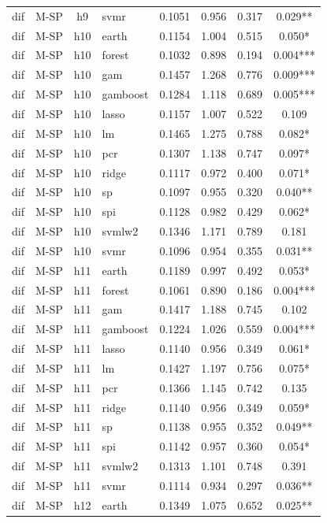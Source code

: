 \begin{ThreePartTable}
\begin{longtable}[t]{llclcccc}
dif & M-SP & h9 & svmr & 0.1051 & 0.956 & 0.317 & 0.029**\\
\addlinespace
dif & M-SP & h10 & earth & 0.1154 & 1.004 & 0.515 & 0.050*\\
dif & M-SP & h10 & forest & 0.1032 & 0.898 & 0.194 & 0.004***\\
dif & M-SP & h10 & gam & 0.1457 & 1.268 & 0.776 & 0.009***\\
dif & M-SP & h10 & gamboost & 0.1284 & 1.118 & 0.689 & 0.005***\\
dif & M-SP & h10 & lasso & 0.1157 & 1.007 & 0.522 & 0.109\\
dif & M-SP & h10 & lm & 0.1465 & 1.275 & 0.788 & 0.082*\\
dif & M-SP & h10 & pcr & 0.1307 & 1.138 & 0.747 & 0.097*\\
dif & M-SP & h10 & ridge & 0.1117 & 0.972 & 0.400 & 0.071*\\
dif & M-SP & h10 & sp & 0.1097 & 0.955 & 0.320 & 0.040**\\
dif & M-SP & h10 & spi & 0.1128 & 0.982 & 0.429 & 0.062*\\
dif & M-SP & h10 & svmlw2 & 0.1346 & 1.171 & 0.789 & 0.181\\
dif & M-SP & h10 & svmr & 0.1096 & 0.954 & 0.355 & 0.031**\\
\addlinespace
dif & M-SP & h11 & earth & 0.1189 & 0.997 & 0.492 & 0.053*\\
dif & M-SP & h11 & forest & 0.1061 & 0.890 & 0.186 & 0.004***\\
dif & M-SP & h11 & gam & 0.1417 & 1.188 & 0.745 & 0.102\\
dif & M-SP & h11 & gamboost & 0.1224 & 1.026 & 0.559 & 0.004***\\
dif & M-SP & h11 & lasso & 0.1140 & 0.956 & 0.349 & 0.061*\\
dif & M-SP & h11 & lm & 0.1427 & 1.197 & 0.756 & 0.075*\\
dif & M-SP & h11 & pcr & 0.1366 & 1.145 & 0.742 & 0.135\\
dif & M-SP & h11 & ridge & 0.1140 & 0.956 & 0.349 & 0.059*\\
dif & M-SP & h11 & sp & 0.1138 & 0.955 & 0.352 & 0.049**\\
dif & M-SP & h11 & spi & 0.1142 & 0.957 & 0.360 & 0.054*\\
dif & M-SP & h11 & svmlw2 & 0.1313 & 1.101 & 0.748 & 0.391\\
dif & M-SP & h11 & svmr & 0.1114 & 0.934 & 0.297 & 0.036**\\
\addlinespace
dif & M-SP & h12 & earth & 0.1349 & 1.075 & 0.652 & 0.025**\\

\end{longtable}
\end{ThreePartTable}
